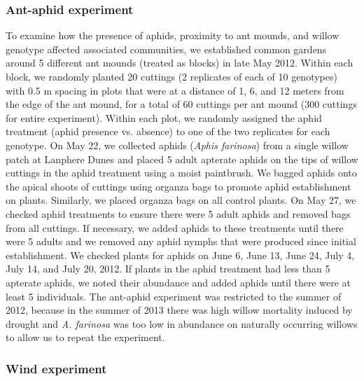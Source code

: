 \documentclass[11pt]{article}
\begin{document}
\subsubsection*{Ant-aphid experiment}

To examine how the presence of aphids, proximity to ant mounds, and
willow genotype affected associated communities, we established common
gardens around 5 different ant mounds (treated as blocks) in late May
2012. Within each block, we randomly planted 20 cuttings (2 replicates
of each of 10 genotypes) with 0.5 m spacing in plots that were at a
distance of 1, 6, and 12 meters from the edge of the ant mound, for a
total of 60 cuttings per ant mound (300 cuttings for entire experiment).
Within each plot, we randomly assigned the aphid treatment (aphid
presence vs. absence) to one of the two replicates for each genotype. On
May 22, we collected aphids (\emph{Aphis farinosa}) from a single willow
patch at Lanphere Dunes and placed 5 adult apterate aphids on the tips
of willow cuttings in the aphid treatment using a moist paintbrush. We
bagged aphids onto the apical shoots of cuttings using organza bags to
promote aphid establishment on plants. Similarly, we placed organza bags
on all control plants. On May 27, we checked aphid treatments to ensure
there were 5 adult aphids and removed bags from all cuttings. If
necessary, we added aphids to these treatments until there were 5 adults
and we removed any aphid nymphs that were produced since initial
establishment. We checked plants for aphids on June 6, June 13, June 24,
July 4, July 14, and July 20, 2012. If plants in the aphid treatment had
less than 5 apterate aphids, we noted their abundance and added aphids
until there were at least 5 individuals. The ant-aphid experiment was
restricted to the summer of 2012, because in the summer of 2013 there
was high willow mortality induced by drought and \emph{A. farinosa} was
too low in abundance on naturally occurring willows to allow us to
repeat the experiment.

\subsubsection*{Wind experiment}
\end{document}
